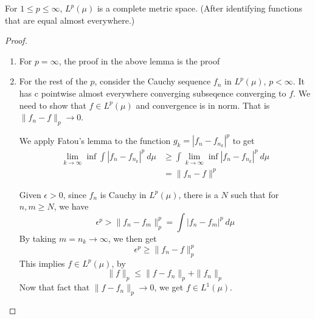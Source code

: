 \begin{theorem}
  For $1 \le p \le \infty$, $L^p(\mu)$ is a complete metric space.
  (After identifying functions that are equal almost everywhere.)
\end{theorem}
\begin{proof}
  \begin{enumerate}[label=(\arabic*)]
    \item For $p = \infty$, the proof in the above lemma is the proof
    \item For the rest of  the $p$, consider the Cauchy sequence
      $f_n$ in $L^p(\mu)$, $p < \infty$. It has c pointwise almost
      everywhere converging subseqence converging to $f$. We need to
      show that $ f \in L^p(\mu)$ and convergence is in norm. That is
      $  \|f_n - f\|_p \to 0$.

      We apply Fatou's lemma to the function $g_k = |f_n - f_{n_k}|^p$ to get
      \begin{align*}
        \lim_{k \to \infty} \inf \int |f_n - f_{n_k}|^p \ d \mu &\ge
        \int \lim_{k \to \infty} \inf |f_n - f_{n_k}|^p \ d \mu \\
        & =  \|f_n - f\|^p
      \end{align*}

      Given $\epsilon > 0$, since $f_n$ is Cauchy in $ L^p(\mu)$,
      there is a $ N$ such that for $n, m \ge N$, we have \[
        \epsilon^p > \|f_n - f_m\|^p_p = \int |f_n - f_m|^p \ d \mu
      \]
      By taking $m = n_k \to \infty$, we then get  \[
        \epsilon^p \ge \|f_n - f\|_p^p
      \]
      This implies $f \in L^p(\mu)$, by \[
        \|f\|_p \le \|f - f_n\|_p  + \|f_n\|_p
      \]
      Now that fact that $\|f - f_n\|_p \to 0$, we get $f \in L^1(\mu)$.
  \end{enumerate}
\end{proof}



